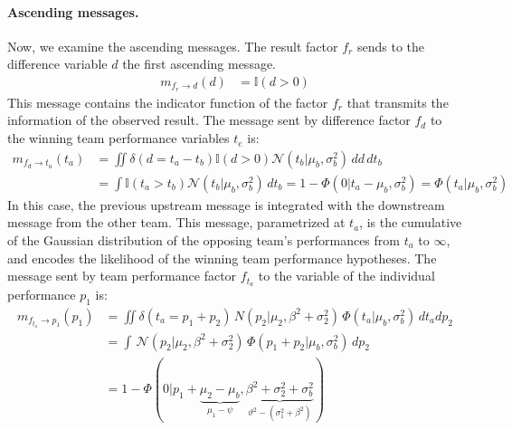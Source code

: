 \documentclass[article]{jss}
\newcommand{\N}{\mathcal{N}}
\begin{document}
\paragraph{Ascending messages.}
%
Now, we examine the ascending messages. 
The result factor $f_r$ sends to the difference variable $d$ the first ascending message. 
%
\begin{equation}%
\begin{split}
m_{f_r \rightarrow d}(d) & = \mathbb{I}(d>0)
\end{split}
\end{equation}
%
This message contains the indicator function of the factor $f_r$ that transmits the information of the observed result. 
The message sent by difference factor $f_d$ to the winning team performance variables $t_e$ is:
%
\begin{equation}%
\begin{split}
m_{f_{d} \rightarrow t_a}(t_a) & = \iint \delta(d = t_a - t_b) \mathbb{I}(d > 0) \N(t_b | \mu_b , \sigma_b^2 ) \, dd\,dt_b \\
& = \int \mathbb{I}( t_a > t_b)  \N(t_b | \mu_b , \sigma_b^2 ) \,dt_b  = 1 - \Phi (0| t_a -\mu_b, \sigma_b^2) = \Phi (t_a| \mu_b, \sigma_b^2)
\end{split}
\end{equation}
%
In this case, the previous upstream message is integrated with the downstream message from the other team. 
This message, parametrized at $t_a$, is the cumulative of the Gaussian distribution of the opposing team's performances from $t_a$ to $\infty$, and encodes the likelihood of the winning team performance hypotheses. 
The message sent by team performance factor $f_{t_a}$ to the variable of the individual performance $p_1$ is:
%
\begin{equation}%
\begin{split}
m_{f_{t_a} \rightarrow p_1}(p_1)  & = \iint \delta( t_a = p_1 + p_2) \, N(p_2| \mu_2, \beta^2 + \sigma_2^2 ) \, \Phi (t_a| \mu_b , \sigma_b^2 ) \, dt_a dp_2 \\
& = \int  \, \N(p_2| \mu_2, \beta^2 + \sigma_2^2 ) \, \Phi (p_1 + p_2| \mu_b , \sigma_b^2 ) \, dp_2 \\
& = 1 - \Phi( 0 | p_1 + \underbrace{\mu_2 - \mu_b}_{\mu_1 - \psi}, \underbrace{\beta^2 + \sigma_2^2 + \sigma_b^2}_{\vartheta^2 - (\sigma_1^2 + \beta^2)}) \\
\end{split}
\end{equation}
\end{document}
